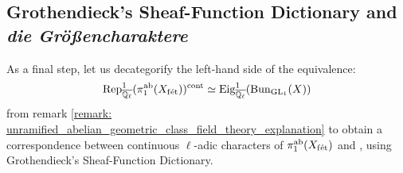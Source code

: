     \subsection{Grothendieck's Sheaf-Function Dictionary and \textit{die Gr\"o{\ss}encharaktere}}
        As a final step, let us decategorify the left-hand side of the equivalence:
            $$\mathrm{Rep}_{\overline{\mathbb{Q}_{\ell}}}^1(\pi_1^{\mathrm{ab}}(X_{\mathrm{f\acute{e}t}}))^{\mathrm{cont}} \simeq \mathrm{Eig}^1_{\overline{\mathbb{Q}_{\ell}}}(\mathrm{Bun}_{\operatorname{GL}_1}(X))$$
        from remark \ref{remark: unramified_abelian_geometric_class_field_theory_explanation} to obtain a correspondence between continuous $\ell$-adic characters of $\pi_1^{\mathrm{ab}}(X_{\mathrm{f\acute{e}t}})$ and , using Grothendieck's Sheaf-Function Dictionary.